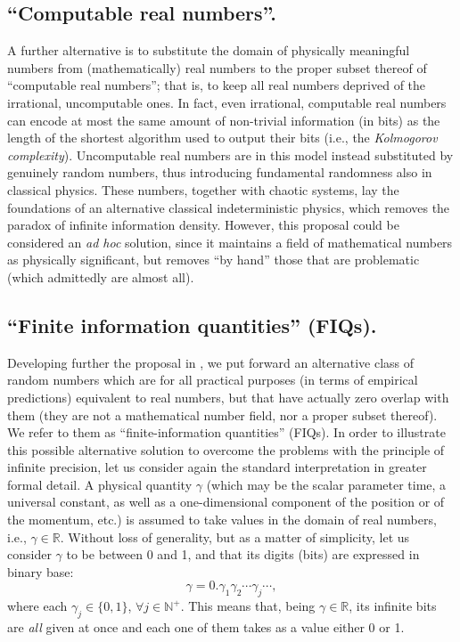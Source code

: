 \documentclass[12pt]{article}
\newcommand{\R}{\mathbb{R}}
\newcommand{\N}{\mathbb{N}}
\begin{document}
\subsection{``Computable real numbers''.}
A further alternative is to substitute the domain of physically meaningful numbers from (mathematically) real numbers to the proper subset thereof of ``computable real numbers''; that is, to keep all real numbers deprived of  the irrational, uncomputable ones. In fact, even irrational, computable real numbers can encode at most the same amount of non-trivial information (in bits) as the length of the shortest algorithm used to output their bits (i.e., the \emph{Kolmogorov complexity}). Uncomputable real numbers are in this model instead substituted by genuinely random numbers, thus introducing fundamental randomness also in classical physics. These numbers, together with chaotic systems, lay the foundations of an alternative classical indeterministic physics, which removes the paradox of infinite information density. However, this proposal could be considered an \emph{ad hoc} solution, since it maintains a field of mathematical numbers as physically significant, but removes ``by hand'' those that are problematic (which admittedly are almost all).

\subsection{``Finite information quantities'' (FIQs).} 
Developing further the proposal in \cite{gisin1}, we put forward an alternative class of random numbers which are for all practical purposes (in terms of empirical predictions) equivalent to real numbers, but that have actually zero overlap with them (they are not a mathematical number field, nor a proper subset thereof). We refer to them as ``finite-information quantities'' (FIQs). In order to illustrate this possible alternative solution to overcome the problems with the principle of infinite precision, let us consider again the standard interpretation in greater formal detail. A physical quantity $\gamma$ (which may be the scalar parameter time, a universal constant, as well as a one-dimensional component of the position or of the momentum, etc.) is assumed to take values in the domain of real numbers, i.e., $\gamma \in \R$. Without loss of generality, but as a matter of simplicity, let us consider $\gamma$ to be between 0 and 1, and that its digits (bits) are expressed in binary base:
%
\begin{equation*}
\gamma=0.\gamma_1\gamma_2\cdots \gamma_j \cdots,
\end{equation*}
%
where each $\gamma_j\in\{0,1\}$, $\forall j\in \N^+$. This means that, being $\gamma \in \R$, its infinite bits are \emph{all} given at once and each one of them takes as a value either 0 or 1. 
\end{document}
